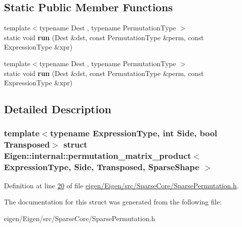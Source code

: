 \subsection*{Static Public Member Functions}
\begin{DoxyCompactItemize}
\item 
\mbox{\label{struct_eigen_1_1internal_1_1permutation__matrix__product_3_01_expression_type_00_01_side_00_01_t20ccd76e9ac5a7579d51cf9e9a5cbb67_a8e9f0f979bf25617f84deb0624a3179c}} 
{\footnotesize template$<$typename Dest , typename Permutation\+Type $>$ }\\static void {\bfseries run} (Dest \&dst, const Permutation\+Type \&perm, const Expression\+Type \&xpr)
\item 
\mbox{\label{struct_eigen_1_1internal_1_1permutation__matrix__product_3_01_expression_type_00_01_side_00_01_t20ccd76e9ac5a7579d51cf9e9a5cbb67_a8e9f0f979bf25617f84deb0624a3179c}} 
{\footnotesize template$<$typename Dest , typename Permutation\+Type $>$ }\\static void {\bfseries run} (Dest \&dst, const Permutation\+Type \&perm, const Expression\+Type \&xpr)
\end{DoxyCompactItemize}


\subsection{Detailed Description}
\subsubsection*{template$<$typename Expression\+Type, int Side, bool Transposed$>$\newline
struct Eigen\+::internal\+::permutation\+\_\+matrix\+\_\+product$<$ Expression\+Type, Side, Transposed, Sparse\+Shape $>$}



Definition at line \hyperlink{eigen_2_eigen_2src_2_sparse_core_2_sparse_permutation_8h_source_l00020}{20} of file \hyperlink{eigen_2_eigen_2src_2_sparse_core_2_sparse_permutation_8h_source}{eigen/\+Eigen/src/\+Sparse\+Core/\+Sparse\+Permutation.\+h}.



The documentation for this struct was generated from the following file\+:\begin{DoxyCompactItemize}
\item 
eigen/\+Eigen/src/\+Sparse\+Core/\+Sparse\+Permutation.\+h\end{DoxyCompactItemize}
